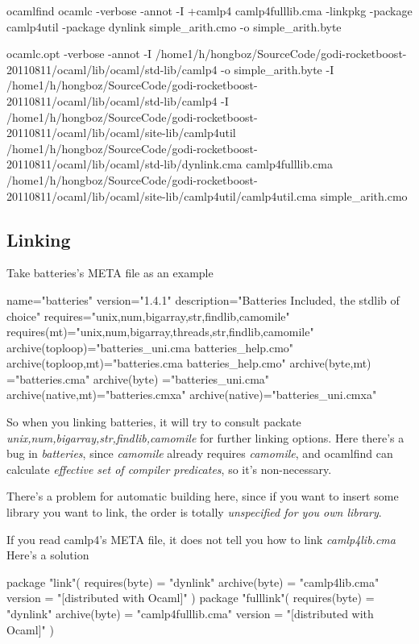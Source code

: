 \begin{bashcode}
ocamlfind  ocamlc -verbose -annot -I +camlp4 camlp4fulllib.cma  -linkpkg -package camlp4util -package dynlink simple_arith.cmo -o simple_arith.byte
  
ocamlc.opt -verbose -annot -I /home1/h/hongboz/SourceCode/godi-rocketboost-20110811/ocaml/lib/ocaml/std-lib/camlp4 -o simple_arith.byte -I /home1/h/hongboz/SourceCode/godi-rocketboost-20110811/ocaml/lib/ocaml/std-lib/camlp4 -I /home1/h/hongboz/SourceCode/godi-rocketboost-20110811/ocaml/lib/ocaml/site-lib/camlp4util  /home1/h/hongboz/SourceCode/godi-rocketboost-20110811/ocaml/lib/ocaml/std-lib/dynlink.cma camlp4fulllib.cma /home1/h/hongboz/SourceCode/godi-rocketboost-20110811/ocaml/lib/ocaml/site-lib/camlp4util/camlp4util.cma simple_arith.cmo  
\end{bashcode}

\subsection{Linking}
\label{sec:Linking}

Take batteries's META file as an example
\begin{bashcode}
name="batteries"
version="1.4.1"
description="Batteries Included, the stdlib of choice"
requires="unix,num,bigarray,str,findlib,camomile"
requires(mt)="unix,num,bigarray,threads,str,findlib,camomile"
archive(toploop)="batteries_uni.cma batteries_help.cmo"
archive(toploop,mt)="batteries.cma batteries_help.cmo"
archive(byte,mt)  ="batteries.cma"
archive(byte)  ="batteries_uni.cma"
archive(native,mt)="batteries.cmxa"
archive(native)="batteries_uni.cmxa"
\end{bashcode}
So when you linking batteries, it will try to consult packate
\textit{unix,num,bigarray,str,findlib,camomile} for further linking
options. Here there's a bug in \textit{batteries}, since
\textit{camomile} already requires \textit{camomile}, and ocamlfind
can calculate \textit{effective set of compiler predicates}, so it's
non-necessary.

There's a problem for automatic building here, since if you want to
insert some library you want to link, the order is totally
\textit{unspecified for you own library}.

If you read camlp4's META file, it does not tell you how to link \textit{camlp4lib.cma}
Here's a solution

\begin{bashcode}
package "link"(
   requires(byte) = "dynlink"  
   archive(byte) = "camlp4lib.cma" 
   version = "[distributed with Ocaml]"
)
package "fulllink"(
   requires(byte) = "dynlink"  
   archive(byte) = "camlp4fulllib.cma" 
   version = "[distributed with Ocaml]"
)
\end{bashcode}

